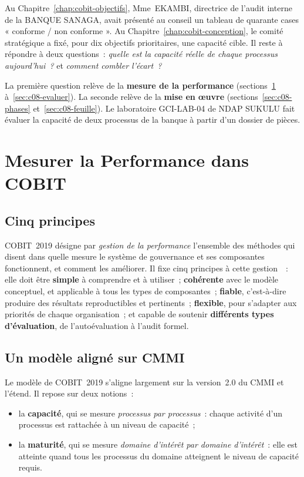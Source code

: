 Au Chapitre~\ref{chap:cobit-objectifs}, Mme~EKAMBI, directrice de l'audit
interne de la BANQUE SANAGA, avait présenté au conseil un tableau de
quarante cases « conforme / non conforme ». Au Chapitre~\ref{chap:cobit-conception},
le comité stratégique a fixé, pour dix objectifs prioritaires, une
capacité cible. Il reste à répondre à deux questions~: \emph{quelle est la
capacité réelle de chaque processus aujourd'hui~?} et \emph{comment combler
l'écart~?}

La première question relève de la \textbf{mesure de la performance}
(sections~\ref{sec:c08-principes} à~\ref{sec:c08-evaluer}). La seconde
relève de la \textbf{mise en œuvre} (sections~\ref{sec:c08-phases}
et~\ref{sec:c08-feuille}). Le laboratoire GCI-LAB-04 de NDAP SUKULU fait
évaluer la capacité de deux processus de la banque à partir d'un dossier
de pièces.

\separateur

\section{Mesurer la Performance dans COBIT}
\label{sec:c08-principes}

\subsection{Cinq principes}

COBIT~2019 désigne par \emph{gestion de la performance} l'ensemble des
méthodes qui disent dans quelle mesure le système de gouvernance et ses
composantes fonctionnent, et comment les améliorer. Il fixe cinq
principes à cette gestion~\cite{isaca2018cobitintro}~: elle doit être
\textbf{simple} à comprendre et à utiliser~; \textbf{cohérente} avec le
modèle conceptuel, et applicable à tous les types de composantes~;
\textbf{fiable}, c'est-à-dire produire des résultats reproductibles et
pertinents~; \textbf{flexible}, pour s'adapter aux priorités de chaque
organisation~; et capable de soutenir \textbf{différents types
d'évaluation}, de l'autoévaluation à l'audit formel.

\subsection{Un modèle aligné sur CMMI}

Le modèle de COBIT~2019 s'aligne largement sur la version~2.0 du CMMI et
l'étend. Il repose sur deux notions~:
\begin{itemize}
    \item la \textbf{capacité}, qui se mesure \emph{processus par
          processus}~: chaque activité d'un processus est rattachée à un
          niveau de capacité~;
    \item la \textbf{maturité}, qui se mesure \emph{domaine d'intérêt par
          domaine d'intérêt}~: elle est atteinte quand tous les processus du
          domaine atteignent le niveau de capacité requis.
\end{itemize}

